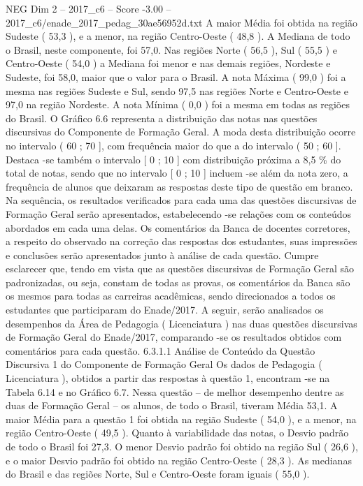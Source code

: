 \begin{textsample}{NEG Dim 2 – 2017\_c6 – Score -3.00 – 2017\_c6/enade\_2017\_pedag\_30ae56952d.txt}
A maior Média foi obtida na região Sudeste ( 53,3 ), e a menor, na região Centro-Oeste ( 48,8 ).
A Mediana de todo o Brasil, neste componente, foi 57,0.
Nas regiões Norte ( 56,5 ), Sul ( 55,5 ) e Centro-Oeste ( 54,0 ) a Mediana foi menor e nas demais regiões, Nordeste e Sudeste, foi 58,0, maior que o valor para o Brasil.
A nota Máxima ( 99,0 ) foi a mesma nas regiões Sudeste e Sul, sendo 97,5 nas regiões Norte e Centro-Oeste e 97,0 na região Nordeste.
A nota Mínima ( 0,0 ) foi a mesma em todas as regiões do Brasil.
O Gráfico 6.6 representa a distribuição das notas nas questões discursivas do Componente de Formação Geral.
A moda desta distribuição ocorre no intervalo ( 60 ; 70 ], com frequência maior do que a do intervalo ( 50 ; 60 ].
Destaca -se também o intervalo [ 0 ; 10 ] com distribuição próxima a 8,5 \% do total de notas, sendo que no intervalo [ 0 ; 10 ] incluem -se além da nota zero, a frequência de alunos que deixaram as respostas deste tipo de questão em branco.
Na sequência, os resultados verificados para cada uma das questões discursivas de Formação Geral serão apresentados, estabelecendo -se relações com os conteúdos abordados em cada uma delas.
Os comentários da Banca de docentes corretores, a respeito do observado na correção das respostas dos estudantes, suas impressões e conclusões serão apresentados junto à análise de cada questão.
Cumpre esclarecer que, tendo em vista que as questões discursivas de Formação Geral são padronizadas, ou seja, constam de todas as provas, os comentários da Banca são os mesmos para todas as carreiras acadêmicas, sendo direcionados a todos os estudantes que participaram do Enade/2017.
A seguir, serão analisados os desempenhos da Área de Pedagogia ( Licenciatura ) nas duas questões discursivas de Formação Geral do Enade/2017, comparando -se os resultados obtidos com comentários para cada questão. 6.3.1.1 Análise de Conteúdo da Questão Discursiva 1 do Componente de Formação Geral Os dados de Pedagogia ( Licenciatura ), obtidos a partir das respostas à questão 1, encontram -se na Tabela 6.14 e no Gráfico 6.7.
Nessa questão – de melhor desempenho dentre as duas de Formação Geral – os alunos, de todo o Brasil, tiveram Média 53,1.
A maior Média para a questão 1 foi obtida na região Sudeste ( 54,0 ), e a menor, na região Centro-Oeste ( 49,5 ).
Quanto à variabilidade das notas, o Desvio padrão de todo o Brasil foi 27,3.
O menor Desvio padrão foi obtido na região Sul ( 26,6 ), e o maior Desvio padrão foi obtido na região Centro-Oeste ( 28,3 ).
As medianas do Brasil e das regiões Norte, Sul e Centro-Oeste foram iguais ( 55,0 ).

\end{textsample}
